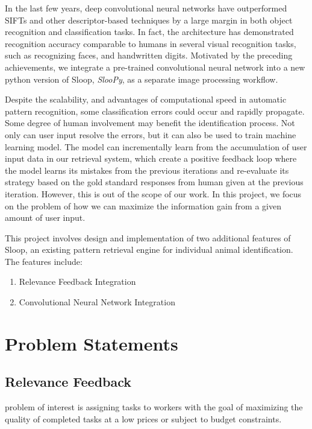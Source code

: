 In the last few years, deep convolutional neural networks\cite{lecun95, kriz12}
have outperformed SIFTs and other descriptor-based techniques by a large margin
in both object recognition and classification tasks\cite{kriz12, fisher14,
ILSVRC15}. In fact, the architecture has demonstrated recognition accuracy
comparable to humans in several visual recognition tasks, such as recognizing
faces\cite{deepface14}, and handwritten digits\cite{mnist13}. Motivated by the
preceding achievements, we integrate a pre-trained convolutional neural network
into a new python version of Sloop, \emph{SlooPy}, as a separate image
processing workflow.

Despite the scalability, and advantages of computational speed in automatic
pattern recognition, some classification errors could occur and rapidly
propagate. Some degree of human involvement may benefit the identification
process. Not only can user input resolve the errors, but it can also be used to
train machine learning model. The model can incrementally learn from the
accumulation of user input data in our retrieval system, which create a
positive feedback loop where the model learns its mistakes from the previous
iterations and re-evaluate its strategy based on the gold standard responses
from human given at the previous iteration. However, this is out of the scope
of our work. In this project, we focus on the problem of how we can maximize
the information gain from a given amount of user input.

This project involves design and implementation of two additional features of
Sloop, an existing pattern retrieval engine for individual animal
identification. The features include: \begin{enumerate} \item Relevance
Feedback Integration \item Convolutional Neural Network Integration
\end{enumerate}

\section{Problem Statements}

\subsection{Relevance Feedback} %
problem of interest is assigning tasks to workers with the goal of maximizing
the quality of completed tasks at a low prices or subject to budget
constraints.


